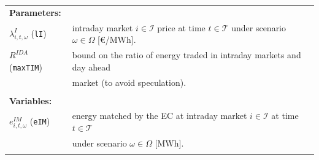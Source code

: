 \documentclass{article}
\begin{document}

\begin{tabularx}{\textwidth}{l l}
    
    \textbf{Parameters:} \\
    	$\lambda^I_{i, t, \omega}$ (\verb|lI|) & intraday market $i \in \mathcal{I}$ price at time $t \in \mathcal{T}$ under scenario $\omega \in \Omega$ [\euro/MWh]. \\
	$R^{IDA}$ (\verb|maxTIM|) & bound on the ratio of energy traded in intraday markets and day ahead \\
	& market (to avoid speculation).\\
    \\ 
       
    \textbf{Variables:} \\
    $e^{IM}_{i, t, \omega}$ (\verb|eIM|) & energy matched by the EC at intraday market $i \in \mathcal{I}$ at time $t \in \mathcal{T}$ \\
    & under scenario $\omega \in \Omega$ [MWh]. \\
	\\
\end{tabularx}
\end{document}
